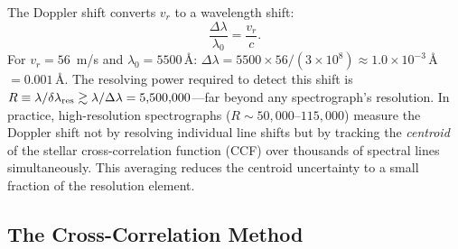 \documentclass[12pt]{article}
\begin{document}
The Doppler shift converts $v_r$ to a wavelength shift:
\begin{equation}\label{eq:doppler}
  \frac{\Delta\lambda}{\lambda_0} = \frac{v_r}{c}.
\end{equation}
For $v_r = 56$~m/s and $\lambda_0 = 5500$\,\AA:
$\Delta\lambda = 5500\times56/(3\times10^8) \approx
1.0\times10^{-3}$\,\AA\ $= 0.001$\,\AA.
The resolving power required to detect this shift is
$R \equiv \lambda/\delta\lambda_{\rm res} \gtrsim
\lambda/\Delta\lambda = 5{,}500{,}000$---far beyond any
spectrograph's resolution.  In practice, high-resolution spectrographs
($R \sim 50{,}000$--$115{,}000$) measure the Doppler shift not by
resolving individual line shifts but by tracking the \emph{centroid}
of the stellar cross-correlation function (CCF) over thousands of
spectral lines simultaneously.  This averaging reduces the
centroid uncertainty to a small fraction of the resolution element.

\subsection{The Cross-Correlation Method}
\end{document}
